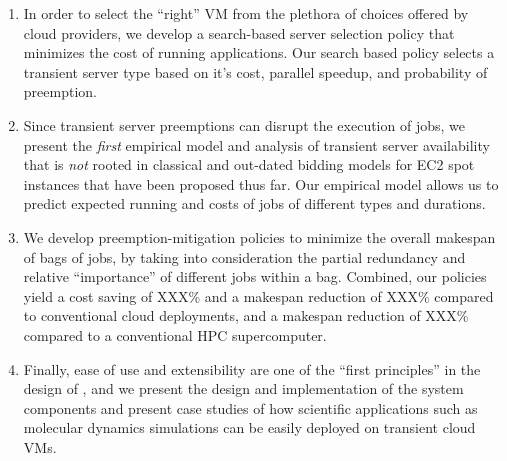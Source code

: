 \begin{enumerate}[leftmargin=12pt]
\item In order to select the ``right'' VM from the plethora of choices offered by cloud providers, we develop a search-based server selection policy that minimizes the cost of running applications. Our search based policy selects a transient server type based on it's cost, parallel speedup, and probability of preemption. 

  
\item Since transient server preemptions can disrupt the execution of jobs, we present the \emph{first} empirical model and analysis of transient server availability that is \emph{not} rooted in classical and out-dated bidding models for EC2 spot instances that have been proposed thus far. Our empirical model allows us to predict expected running and costs of jobs of different types and durations. 

  
\item We develop preemption-mitigation policies to minimize the overall makespan of bags of jobs, by taking into consideration the partial redundancy and relative ``importance'' of different jobs within a bag. Combined, our policies yield a cost saving of XXX\% and a makespan reduction of XXX\% compared to conventional cloud deployments, and a makespan reduction of XXX\% compared to a conventional HPC supercomputer. 

\item Finally, ease of use and extensibility are one of the ``first principles'' in the design of \sysname, and we present the design and implementation of the system components and present case studies of how  scientific applications such as molecular dynamics simulations can be easily deployed on transient cloud VMs. 
\end{enumerate}




